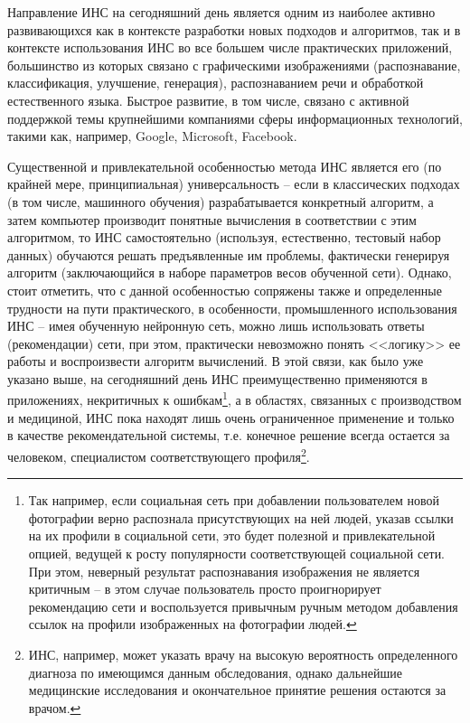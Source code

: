 \documentclass[a4paper,12pt,russian]{article} %
\begin{document}
Направление ИНС на сегодняшний день является одним из наиболее активно развивающихся как в контексте разработки новых подходов и алгоритмов, так и в контексте использования ИНС во все большем числе практических приложений, большинство из которых связано с графическими изображениями (распознавание, классификация, улучшение, генерация), распознаванием речи и обработкой естественного языка.
Быстрое развитие, в том числе, связано с активной поддержкой темы крупнейшими компаниями сферы информационных технологий, такими как, например, Google, Microsoft, Facebook.

Существенной и привлекательной особенностью метода ИНС является его (по крайней мере, принципиальная) универсальность -- если в классических подходах (в том числе, машинного обучения) разрабатывается конкретный алгоритм, а затем компьютер производит понятные вычисления в соответствии с этим алгоритмом, то ИНС самостоятельно (используя, естественно, тестовый набор данных) обучаются решать предъявленные им проблемы, фактически генерируя алгоритм (заключающийся в наборе параметров весов обученной сети). Однако, стоит отметить, что с данной особенностью сопряжены также и определенные трудности на пути практического, в особенности, промышленного использования ИНС -- имея обученную нейронную сеть, можно лишь использовать ответы (рекомендации) сети, при этом, практически невозможно понять <<логику>> ее работы и воспроизвести алгоритм вычислений. В этой связи, как было уже указано выше, на сегодняшний день ИНС преимущественно применяются в приложениях, некритичных к ошибкам\footnote{
	Так например, если социальная сеть при добавлении пользователем новой фотографии верно распознала присутствующих на ней людей, указав ссылки на их профили в социальной сети, это будет полезной и привлекательной опцией, ведущей к росту популярности соответствующей социальной сети.
	При этом, неверный результат распознавания изображения не является критичным -- в этом случае пользователь просто проигнорирует рекомендацию сети и воспользуется привычным ручным методом добавления ссылок на профили изображенных на фотографии людей.
},
а в областях, связанных с производством и медициной, ИНС пока находят лишь очень ограниченное применение и только в качестве рекомендательной системы, т.е. конечное решение всегда остается за человеком, специалистом соответствующего профиля\footnote{
	ИНС, например, может указать врачу на высокую вероятность определенного диагноза по имеющимся данным обследования, однако дальнейшие медицинские исследования и окончательное принятие решения остаются за врачом.
}.
\end{document}
